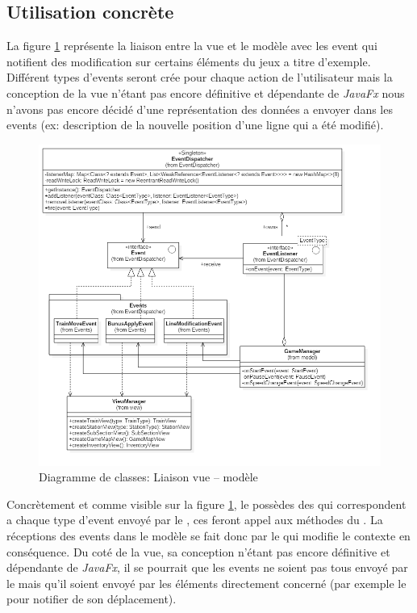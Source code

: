 \documentclass[report, backcover, french, nodocumentinfo]{upmethodology-document}
\begin{document}
			\subsection{Utilisation concrète}
				\p{}
					La figure \ref{fig:ViewModelLinkClassDiagram} représente la liaison entre la vue et le modèle avec les event qui notifient des modification sur certains éléments du jeux a titre d'exemple. Différent types d'events seront crée pour chaque action de l'utilisateur mais la conception de la vue n'étant pas encore définitive et dépendante de \textit{JavaFx} nous n'avons pas encore décidé d'une représentation des données a envoyer dans les events (ex: description de la nouvelle position d'une ligne qui a été modifié).
					\begin{figure}[h!]
						\centering
						\includegraphics[width=\textwidth]{figures/ViewModelLinkClassDiagram}
						\caption{Diagramme de classes: Liaison vue -- modèle}
						\label{fig:ViewModelLinkClassDiagram}
					\end{figure}
				\p{}
					Concrètement et comme visible sur la figure \ref{fig:ViewModelLinkClassDiagram}, le  possèdes des  qui correspondent a chaque type d'event envoyé par le , ces  feront appel aux méthodes  du . La réceptions des events dans le modèle se fait donc par le  qui modifie le contexte en conséquence. Du coté de la vue, sa conception n'étant pas encore définitive et dépendante de \textit{JavaFx}, il se pourrait que les events ne soient pas tous envoyé par le  mais qu'il soient envoyé par les éléments directement concerné (par exemple le  pour notifier de son déplacement).
\end{document}
